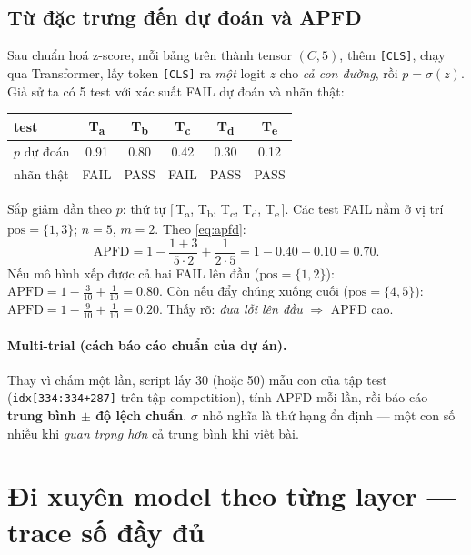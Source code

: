 \documentclass[11pt]{article}
\newcommand{\code}[1]{\textcolor{cInk}{\texttt{#1}}}
\theoremstyle{definition}
\begin{document}
\subsection{Từ đặc trưng đến dự đoán và APFD}
\label{sec:apfd-example}
Sau chuẩn hoá z-score, mỗi bảng trên thành tensor $(C,5)$, thêm \code{[CLS]},
chạy qua Transformer, lấy token \code{[CLS]} ra \emph{một} logit $z$ cho \emph{cả
con đường}, rồi $p=\sigma(z)$. Giả sử ta có 5 test với xác suất FAIL dự đoán và
nhãn thật:
\begin{center}\small
\begin{tabular}{@{}l c c c c c@{}}
\toprule
test & T\textsubscript{a} & T\textsubscript{b} & T\textsubscript{c} & T\textsubscript{d} & T\textsubscript{e}\\
\midrule
$p$ dự đoán & 0.91 & 0.80 & 0.42 & 0.30 & 0.12\\
nhãn thật   & FAIL & PASS & FAIL & PASS & PASS\\
\bottomrule
\end{tabular}
\end{center}
Sắp giảm dần theo $p$: thứ tự $[\,$T\textsubscript{a}, T\textsubscript{b},
T\textsubscript{c}, T\textsubscript{d}, T\textsubscript{e}$\,]$. Các test FAIL
nằm ở vị trí $\mathrm{pos}=\{1,3\}$; $n=5$, $m=2$. Theo \eqref{eq:apfd}:
\[
\mathrm{APFD}=1-\frac{1+3}{5\cdot2}+\frac{1}{2\cdot5}
=1-0.40+0.10=\mathbf{0.70}.
\]
Nếu mô hình xếp được cả hai FAIL lên đầu ($\mathrm{pos}=\{1,2\}$):
$\mathrm{APFD}=1-\tfrac{3}{10}+\tfrac{1}{10}=0.80$. Còn nếu đẩy chúng xuống cuối
($\mathrm{pos}=\{4,5\}$): $\mathrm{APFD}=1-\tfrac{9}{10}+\tfrac{1}{10}=0.20$.
Thấy rõ: \emph{đưa lỗi lên đầu} $\Rightarrow$ APFD cao.

\paragraph{Multi-trial (cách báo cáo chuẩn của dự án).} Thay vì chấm một lần,
script lấy 30 (hoặc 50) mẫu con của tập test (\code{idx[334:334+287]} trên tập
competition), tính APFD mỗi lần, rồi báo cáo \textbf{trung bình $\pm$ độ lệch
chuẩn}. $\sigma$ nhỏ nghĩa là thứ hạng ổn định --- một con số nhiều khi
\emph{quan trọng hơn} cả trung bình khi viết bài.

\section{Đi xuyên model theo từng layer --- trace số đầy đủ}
\label{sec:trace}
\end{document}
